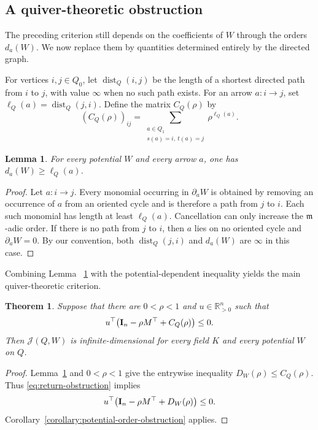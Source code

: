 \documentclass[11pt,letterpaper,reqno]{amsart}
\newtheorem{theorem}{Theorem}[section]
\newtheorem{lemma}[lemma]{Lemma}
\theoremstyle{definition}
\newcommand{\m}{\mathfrak m}
\newcommand{\Jac}{\mathcal J}
\begin{document}
	\subsection{A quiver-theoretic obstruction}
	
	The preceding criterion still depends on the coefficients of $W$ through
	the orders $d_a(W)$.  We now replace them by quantities determined entirely
	by the directed graph.
	
	For vertices $i,j\in Q_0$, let $\operatorname{dist}_Q(i,j)$ be the length of a shortest directed path from $i$ to $j$, with value $\infty$ when no such path exists. For an arrow $a:i\to j$, set $\ell_Q(a)=\operatorname{dist}_Q(j,i)$. Define the matrix $C_Q(\rho)$ by
	\[
	(C_Q(\rho))_{ij}
	=\sum_{\substack{a\in Q_1\\s(a)=i,\ t(a)=j}}
	\rho^{\ell_Q(a)}.
	\]
	
	\begin{lemma}
		\label{lemma:return-order}
		For every potential $W$ and every arrow $a$, one has
		$d_a(W)\geq\ell_Q(a)$.
	\end{lemma}
	
	\begin{proof}
		Let $a:i\to j$.  Every monomial occurring in $\partial_aW$ is obtained by
		removing an occurrence of $a$ from an oriented cycle and is therefore a
		path from $j$ to $i$.  Each such monomial has length at least
		$\ell_Q(a)$.  Cancellation can only increase the $\m$-adic order.  If there
		is no path from $j$ to $i$, then $a$ lies on no oriented cycle and
		$\partial_aW=0$. By our convention, both $\operatorname{dist}_Q(j,i)$ and $d_a(W)$ are $\infty$ in this case.
	\end{proof}
	
	Combining Lemma~
	\ref{lemma:return-order} with the potential-dependent
	inequality yields the main quiver-theoretic criterion.
	
	\begin{theorem}
		\label{theorem:return-obstruction}
		Suppose that there are $0<\rho<1$ and
		$u\in\mathbb R_{>0}^{n}$ such that
		\begin{equation}
			\label{eq:return-obstruction}
			u^{\top}
			\bigl({\bf I}_{n}-\rho M^{\top}+C_Q(\rho)\bigr)
			\leq0.
		\end{equation}
		Then $\Jac(Q,W)$ is infinite-dimensional for every field $K$ and every
		potential $W$ on $Q$.
	\end{theorem}
	
	\begin{proof}
		Lemma~\ref{lemma:return-order} and $0<\rho<1$ give the entrywise inequality
		$D_W(\rho)\leq C_Q(\rho)$.  Thus \eqref{eq:return-obstruction} implies
		\[
		u^{\top}
		\bigl({\bf I}_{n}-\rho M^{\top}+D_W(\rho)\bigr)\leq0.
		\]
		Corollary~\ref{corollary:potential-order-obstruction} applies.
	\end{proof}
	
\end{document}
